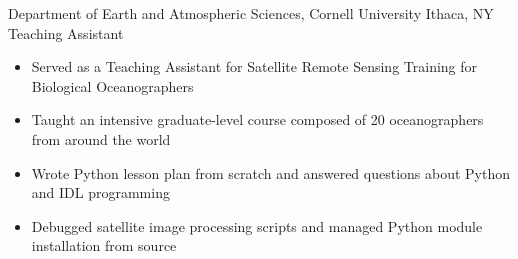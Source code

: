 
        {Department of Earth and Atmospheric Sciences, Cornell University}
        {Ithaca, NY}
        {Teaching Assistant}
        {}{
    \begin{itemize}
        \item Served as a Teaching Assistant for Satellite Remote Sensing Training for Biological Oceanographers
        \item Taught an intensive graduate-level course composed of 20 oceanographers from around the world
        \item Wrote Python lesson plan from scratch and answered questions about Python and IDL programming
        \item Debugged satellite image processing scripts and managed Python module installation from source
    \end{itemize}
}
